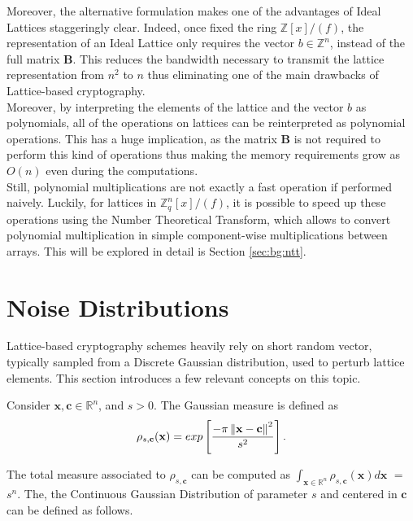Moreover, the alternative formulation makes one of the advantages of Ideal Lattices staggeringly clear. Indeed, once fixed the ring $\mathbb{Z}[x]/(f)$, the representation of an Ideal Lattice only requires the vector $b\in\mathbb{Z}^n$, instead of the full matrix $\mathbf{B}$. This reduces the bandwidth necessary to transmit the lattice representation from $n^2$ to $n$ thus eliminating one of the main drawbacks of Lattice-based cryptography.\\
Moreover, by interpreting the elements of the lattice and the vector $b$ as polynomials, all of the operations on lattices can be reinterpreted as polynomial operations. This has a huge implication, as the matrix $\mathbf{B}$ is not required to perform this kind of operations thus making the memory requirements grow as $O(n)$ even during the computations.\\
Still, polynomial multiplications are not exactly a fast operation if performed naively. Luckily, for lattices in $\mathbb{Z}_q^n[x]/(f)$, it is possible to speed up these operations using the Number Theoretical Transform, which allows to convert polynomial multiplication in simple component-wise multiplications between arrays. This will be explored in detail is Section \ref{sec:bg:ntt}.

\section{Noise Distributions}
Lattice-based cryptography schemes heavily rely on short random vector, typically sampled from a Discrete Gaussian distribution, used to perturb lattice elements. This section introduces a few relevant concepts on this topic.\\

\begin{definition}
Consider $\mathbf{x},\mathbf{c}\in\mathbb{R}^n$, and $s>0$. The Gaussian measure is defined as
\begin{equation*}
\rho_{s,\mathbf{c}}(\mathbf{x}) = exp\left[\frac{-\pi\left\lVert \mathbf{x}-\mathbf{c} \right\rVert^2}{s^2}\right].
\end{equation*}
\end{definition}

The total measure associated to $\rho_{s,\mathbf{c}}$ can be computed as $\int_{\mathbf{x}\in\mathbb{R}^n}\rho_{s,\mathbf{c}}(\mathbf{x})d\mathbf{x}$ $=$ $s^n$. The, the Continuous Gaussian Distribution of parameter $s$ and centered in $\mathbf{c}$ can be defined as follows.

